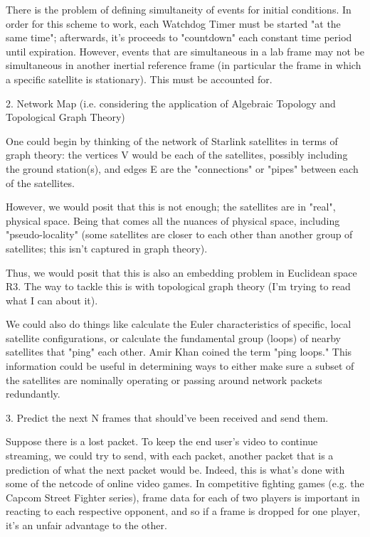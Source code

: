 \documentclass[10pt]{amsart}
\begin{document}
There is the problem of defining simultaneity of events for initial conditions. In order for this scheme to work, each Watchdog Timer must be started "at the same time"; afterwards, it's proceeds to "countdown" each constant time period until expiration. However, events that are simultaneous in a lab frame may not be simultaneous in another inertial reference frame (in particular the frame in which a specific satellite is stationary). This must be accounted for.

2. Network Map (i.e. considering the application of Algebraic Topology and Topological Graph Theory)

One could begin by thinking of the network of Starlink satellites in terms of graph theory: the vertices V would be each of the satellites, possibly including the ground station(s), and edges E are the "connections" or "pipes" between each of the satellites.

However, we would posit that this is not enough; the satellites are in "real", physical space. Being that comes all the nuances of physical space, including "pseudo-locality" (some satellites are closer to each other than another group of satellites; this isn't captured in graph theory). 

Thus, we would posit that this is also an embedding problem in Euclidean space R3. The way to tackle this is with topological graph theory (I'm trying to read what I can about it).

We could also do things like calculate the Euler characteristics of specific, local satellite configurations, or calculate the fundamental group (loops) of nearby satellites that "ping" each other. Amir Khan coined the term "ping loops." This information could be useful in determining ways to either make sure a subset of the satellites are nominally operating or passing around network packets redundantly.

3. Predict the next N frames that should've been received and send them.

Suppose there is a lost packet. To keep the end user's video to continue streaming, we could try to send, with each packet, another packet that is a prediction of what the next packet would be. Indeed, this is what's done with some of the netcode of online video games. In competitive fighting games (e.g. the Capcom Street Fighter series), frame data for each of two players is important in reacting to each respective opponent, and so if a frame is dropped for one player, it's an unfair advantage to the other.
\end{document}
